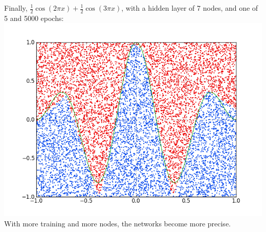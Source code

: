 \documentclass[12pt]{article}
\begin{document}
\begin{enumerate}
Finally, $\frac{1}{2} \cos(2 \pi x) + \frac{1}{2} \cos(3 \pi x)$, with a hidden layer of 7 nodes, and one of 5 and 5000 epochs: \\ 
\includegraphics[scale=0.5]{test7.png}\\

With more training and more nodes, the networks become more precise.


\end{enumerate}
\end{document}
